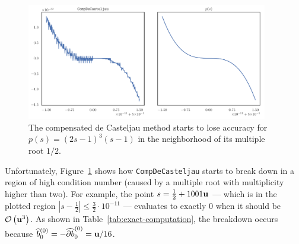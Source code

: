 \begin{figure}
  \includegraphics[width=0.9375\textwidth]
                  {../images/k-compensated/compensated_insufficient.pdf}
  \centering
  \captionsetup{width=.75\linewidth}
  \caption{The compensated de Casteljau method starts to lose accuracy
    for \(p(s) = (2s - 1)^3 (s - 1)\) in the neighborhood of its
    multiple root \(1/2\).}
  \label{fig:compensated-insufficient}
\end{figure}

Unfortunately, Figure~\ref{fig:compensated-insufficient} shows how
\texttt{CompDeCasteljau} starts to break down in a region of
high condition number (caused by a multiple root with multiplicity
higher than two). For example, the point
\(s = \frac{1}{2} + 1001\mathbf{u}\)
--- which is in the plotted region \(\left|s - \frac{1}{2}\right|
\leq \frac{3}{2} \cdot 10^{-11}\) --- evaluates to exactly \(0\) when
it should be \(\mathcal{O}\left(\mathbf{u}^3\right)\). As shown in
Table~\ref{tab:exact-computation}, the breakdown occurs because
\(\widehat{b}_0^{(0)} = -\cdb{1}_0^{(0)} = \mach / 16\).

